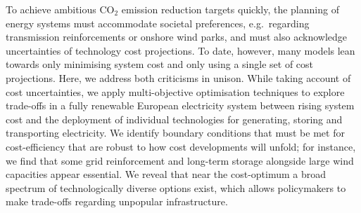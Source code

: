 
To achieve ambitious CO$_2$ emission reduction targets quickly, the planning of
energy systems must accommodate societal preferences, e.g.~regarding
transmission reinforcements or onshore wind parks, and must also acknowledge
uncertainties of technology cost projections. To date, however, many models lean
towards only minimising system cost and only using a single set of cost
projections. Here, we address both criticisms in unison. While taking account of
cost uncertainties, we apply multi-objective optimisation techniques to explore
trade-offs in a fully renewable European electricity system between rising
system cost and the deployment of individual technologies for generating,
storing and transporting electricity. We identify boundary conditions that must
be met for cost-efficiency that are robust to how cost developments will unfold;
for instance, we find that some grid reinforcement and long-term storage
alongside large wind capacities appear essential. We reveal that near the
cost-optimum a broad spectrum of technologically diverse options exist, which
allows policymakers to make trade-offs regarding unpopular infrastructure.


